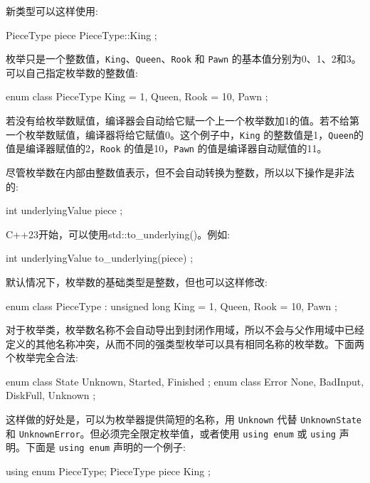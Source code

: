 新类型可以这样使用:

\begin{cpp}
PieceType piece { PieceType::King };
\end{cpp}

枚举只是一个整数值，\verb|King|、\verb|Queen|、\verb|Rook| 和 \verb|Pawn| 的基本值分别为0、1、2和3。可以自己指定枚举数的整数值:

\begin{cpp}
enum class PieceType
{
    King = 1,
    Queen,
    Rook = 10,
    Pawn
};
\end{cpp}

若没有给枚举数赋值，编译器会自动给它赋一个上一个枚举数加1的值。若不给第一个枚举数赋值，编译器将给它赋值0。这个例子中，\verb|King| 的整数值是1，\verb|Queen|的值是编译器赋值的2，\verb|Rook| 的值是10，\verb|Pawn| 的值是编译器自动赋值的11。

尽管枚举数在内部由整数值表示，但不会自动转换为整数，所以以下操作是非法的:

\begin{cpp}
int underlyingValue { piece };
\end{cpp}


C++23开始，可以使用std::to\_underlying()。例如:

\begin{cpp}
int underlyingValue { to_underlying(piece) };
\end{cpp}

默认情况下，枚举数的基础类型是整数，但也可以这样修改:

\begin{cpp}
enum class PieceType : unsigned long
{
    King = 1,
    Queen,
    Rook = 10,
    Pawn
};
\end{cpp}

对于枚举类，枚举数名称不会自动导出到封闭作用域，所以不会与父作用域中已经定义的其他名称冲突，从而不同的强类型枚举可以具有相同名称的枚举数。下面两个枚举完全合法:

\begin{cpp}
enum class State { Unknown, Started, Finished };
enum class Error { None, BadInput, DiskFull, Unknown };
\end{cpp}

这样做的好处是，可以为枚举器提供简短的名称，用 \verb|Unknown| 代替 \verb|UnknownState| 和 \verb|UnknownError|。但必须完全限定枚举值，或者使用 \verb|using enum| 或 \verb|using| 声明。下面是 \verb|using enum| 声明的一个例子:

\begin{cpp}
using enum PieceType;
PieceType piece { King };
\end{cpp}


